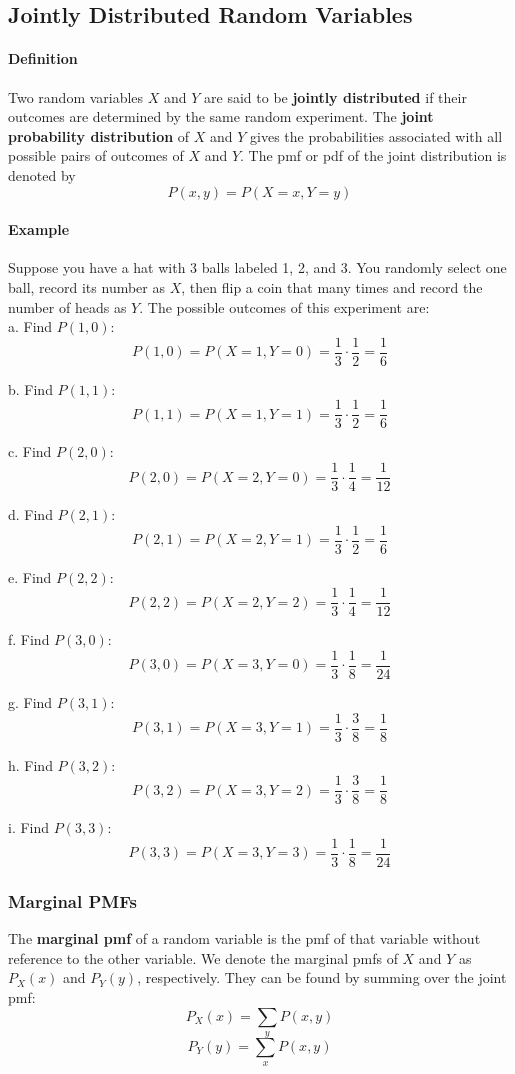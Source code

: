 \subsection{Jointly Distributed Random Variables}
\hrulefill

\paragraph{Definition}
Two random variables $X$ and $Y$ are said to be \textbf{jointly distributed} if their outcomes are determined 
by the same random experiment. The \textbf{joint probability distribution} of $X$ and $Y$ gives the probabilities 
associated with all possible pairs of outcomes of $X$ and $Y$. The pmf or pdf of the joint distribution is denoted by
\[
P(x,y) = P(X=x, Y=y)
\]

\paragraph{Example}
Suppose you have a hat with 3 balls labeled 1, 2, and 3. You randomly select one ball, record its number as $X$,
then flip a coin that many times and record the number of heads as $Y$. The possible outcomes of this experiment are:\\

a. Find $P(1,0)$:
\[
P(1,0) = P(X=1, Y=0) = \frac{1}{3} \cdot \frac{1}{2} = \frac{1}{6}
\]

b. Find $P(1,1)$:
\[
P(1,1) = P(X=1, Y=1) = \frac{1}{3} \cdot \frac{1}{2} = \frac{1}{6}
\]

c. Find $P(2,0)$:
\[
P(2,0) = P(X=2, Y=0) = \frac{1}{3} \cdot \frac{1}{4} = \frac{1}{12}
\]

d. Find $P(2,1)$:
\[
P(2,1) = P(X=2, Y=1) = \frac{1}{3} \cdot \frac{1}{2} = \frac{1}{6}
\]

e. Find $P(2,2)$:
\[
P(2,2) = P(X=2, Y=2) = \frac{1}{3} \cdot \frac{1}{4} = \frac{1}{12}
\]

f. Find $P(3,0)$:
\[
P(3,0) = P(X=3, Y=0) = \frac{1}{3} \cdot \frac{1}{8} = \frac{1}{24}
\]  

g. Find $P(3,1)$:
\[
P(3,1) = P(X=3, Y=1) = \frac{1}{3} \cdot \frac{3}{8} = \frac{1}{8}
\]

h. Find $P(3,2)$:
\[
P(3,2) = P(X=3, Y=2) = \frac{1}{3} \cdot \frac{3}{8} = \frac{1}{8}
\]

i. Find $P(3,3)$:
\[
P(3,3) = P(X=3, Y=3) = \frac{1}{3} \cdot \frac{1}{8} = \frac{1}{24}
\]

\subsubsection*{Marginal PMFs}
The \textbf{marginal pmf} of a random variable is the pmf of that variable without reference to the other variable.
We denote the marginal pmfs of $X$ and $Y$ as $P_X(x)$ and $P_Y(y)$, respectively. They can be found by summing
over the joint pmf:
\[
P_X(x) = \sum_y P(x,y)
\]
\[
P_Y(y) = \sum_x P(x,y)
\]

